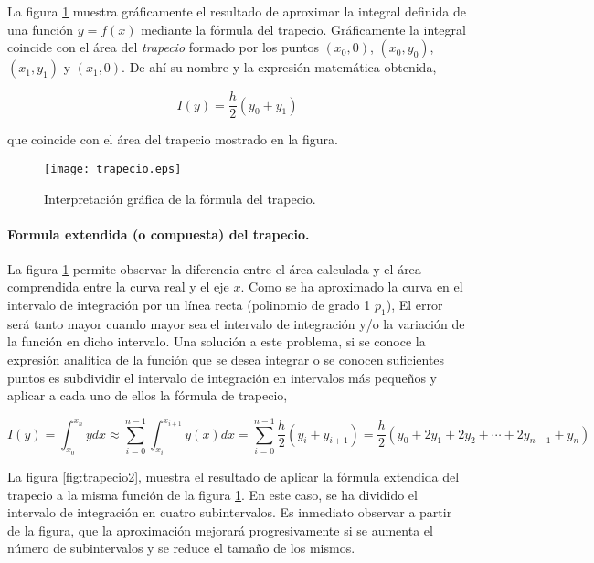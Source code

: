 La figura \ref{fig:trapecio} muestra gráficamente el resultado de aproximar la integral definida de una función $y=f(x)$ mediante la fórmula del trapecio. Gráficamente la integral coincide con el área del \emph{trapecio} formado por los puntos $(x_0,0)$, $(x_0,y_0)$, $(x_1,y_1)$ y $(x_1,0)$.  De ahí su nombre y la expresión matemática obtenida,

\begin{equation*}
I(y)=\frac{h}{2}(y_0+y_1)
\end{equation*}

que coincide con el área del trapecio mostrado en la figura.
\begin{figure}[h]
\centering
\texttt{[image: trapecio.eps]}
\caption{Interpretación gráfica de la fórmula del trapecio.} 
\label{fig:trapecio}
\end{figure}

\paragraph*{Formula extendida (o compuesta) del trapecio.} La figura \ref{fig:trapecio} permite observar la diferencia entre el área calculada y el área comprendida entre la curva real y el eje $x$. Como se ha aproximado  la curva en el intervalo de integración por un línea recta (polinomio de grado 1 $p_1$), El error será tanto mayor cuando mayor sea el intervalo de integración y/o la variación de la función en dicho intervalo. Una solución a este problema, si se conoce la expresión analítica de la función que  se desea integrar o se conocen suficientes puntos es subdividir el intervalo de integración en intervalos más pequeños y aplicar a cada uno de ellos la fórmula de trapecio,

\begin{equation*}
I(y)=\int_{x_0}^{x_n}ydx \approx \sum_{i=0}^{n-1}\int_{x_i}^{x_{i+1}}y(x)dx=\sum_{i=0}^{n-1}\frac{h}{2}(y_i+y_{i+1})=\frac{h}{2}\left(y_0+2y_1+2y_2+\cdots+2y_{n-1}+y_n \right)
\end{equation*}

La figura \ref{fig:trapecio2}, muestra el resultado de aplicar la fórmula extendida del trapecio a la misma función de la figura \ref{fig:trapecio}. En este caso, se ha dividido el intervalo de integración en cuatro subintervalos. Es inmediato observar a partir de la figura, que la aproximación mejorará progresivamente si se aumenta el número de subintervalos y se reduce el tamaño de los mismos.

